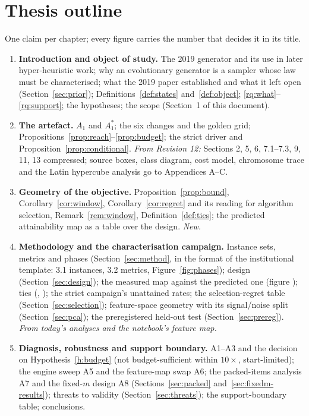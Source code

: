 \documentclass[a4paper,11pt]{article}
\newcommand{\code}[1]{\path{#1}}
\newcommand{\Aone}{A_{1}}
\newcommand{\Astar}{A_{1}^{*}}
\theoremstyle{plain}
\theoremstyle{definition}
\theoremstyle{remark}
\begin{document}
\section{Thesis outline}\label{sec:outline}

One claim per chapter; every figure carries the number that decides it in its title.

\begin{enumerate}[label=\textbf{Ch.~\arabic*},leftmargin=3.6em,itemsep=4pt]
\item \textbf{Introduction and object of study.} The 2019 generator and its use in later
hyper-heuristic work; why an evolutionary generator is a sampler whose law must be
characterised; what the 2019 paper established and what it left open (Section~\ref{sec:prior});
Definitions~\ref{def:states} and~\ref{def:object}; \ref{rq:what}--\ref{rq:support};
the hypotheses; the scope (Section~1 of this document).
\item \textbf{The artefact.} $\Aone$ and $\Astar$; the six changes and the golden grid;
Propositions~\ref{prop:reach}--\ref{prop:budget}; the strict driver and
Proposition~\ref{prop:conditional}. \emph{From Revision 12:} Sections 2, 5, 6, 7.1--7.3, 9,
11, 13 compressed; source boxes, class diagram, cost model, chromosome trace and the Latin
hypercube analysis go to Appendices A--C.
\item \textbf{Geometry of the objective.} Proposition~\ref{prop:bound},
Corollary~\ref{cor:window}, Corollary~\ref{cor:regret} and its reading for algorithm
selection, Remark~\ref{rem:window}, Definition~\ref{def:ties}; the predicted attainability
map as a table over the design. \emph{New.}
\item \textbf{Methodology and the characterisation campaign.} Instance sets, metrics and
phases (Section~\ref{sec:method}, in the format of the institutional template: 3.1
instances, 3.2 metrics, Figure~\ref{fig:phases}); design (Section~\ref{sec:design}); the measured
map against the predicted one (figure \code{outcomes_per_cell}); ties
(\code{pair_ties_per_cell}, \code{ties_all}); the strict campaign's unattained rates;
the selection-regret table (Section~\ref{sec:selection});
feature-space geometry with its signal/noise split (Section~\ref{sec:pca}); the
preregistered held-out test (Section~\ref{sec:prereg}). \emph{From today's analyses and the
notebook's feature map.}
\item \textbf{Diagnosis, robustness and support boundary.} A1--A3 and the decision on
Hypothesis~\ref{h:budget} (not budget-sufficient within $10\times$, start-limited); the engine sweep A5 and the feature-map swap A6; the
packed-items analysis A7 and the fixed-$m$ design A8 (Sections~\ref{sec:packed}
and~\ref{sec:fixedm-results}); threats to validity (Section~\ref{sec:threats}); the support-boundary table; conclusions.
\end{enumerate}
\end{document}
